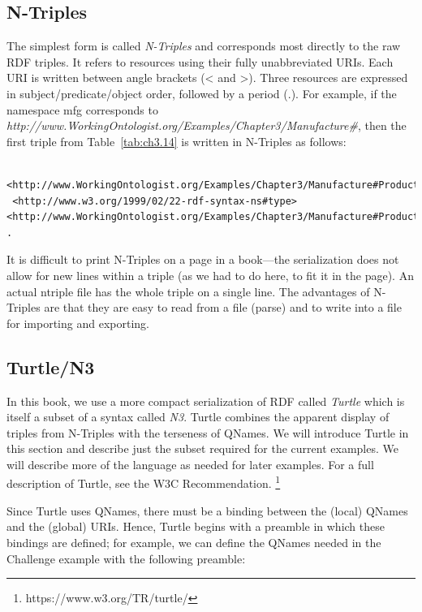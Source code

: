 \subsection{N-Triples}
\label{ntriples}

The simplest form is called \emph{N-Triples} and corresponds most directly to
the raw RDF triples. It refers to resources using their fully
unabbreviated URIs. Each URI is written between angle brackets
(\textless{} and \textgreater{}). Three resources are expressed in
subject/predicate/object order, followed by a period (.). For example,
if the namespace mfg corresponds to
\emph{http://www.WorkingOntologist.org/Examples/Chapter3/Manufacture\#}, then the first triple from Table~\ref{tab:ch3.14} is written
in N-Triples as follows:


\begin{lstlisting}
 <http://www.WorkingOntologist.org/Examples/Chapter3/Manufacture#Product1>
 <http://www.w3.org/1999/02/22-rdf-syntax-ns#type> <http://www.WorkingOntologist.org/Examples/Chapter3/Manufacture#Product> .
\end{lstlisting}

It is difficult to print N-Triples on a page in a book---the
serialization does not allow for new lines within a triple (as we had to
do here, to fit it in the page). An actual ntriple file has the whole
triple on a single line. The advantages of N-Triples are that they are
easy to read from a file (parse) and to write into a file for importing
and exporting.

\subsection{Turtle/N3}
\label{ch3.turtle}
In this book, we use a more compact serialization of RDF called
\emph{Turtle} which is itself a subset of a syntax called \emph{N3}. Turtle
combines the apparent display of triples from N-Triples with the
terseness of QNames. We will introduce Turtle in this section and
describe just the subset required for the current examples. We will
describe more of the language as needed for later examples. For a full
description of Turtle, see the W3C Recommendation. \footnote{https://www.w3.org/TR/turtle/}

Since Turtle uses QNames, there must be a binding between the (local)
QNames and the (global) URIs. Hence, Turtle begins with a preamble in
which these bindings are defined; for example, we can define the QNames
needed in the Challenge example with the following preamble:

